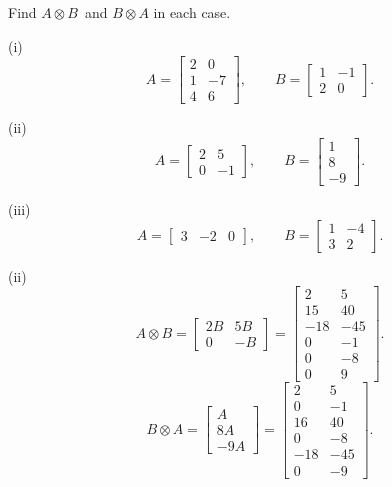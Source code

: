 \begin{Exercises}
\exercise
Find $A\otimes B$~and $B\otimes A$ in each case.
\begin{description}
\item{(i)}
\[
A=\begin{bmatrix}2&0\\ 1&-7\\ 4&6 \end{bmatrix},\qquad
B=\begin{bmatrix}1&-1\\ 2&0 \end{bmatrix}.
\]
\item{(ii)}
\[
A=\begin{bmatrix}2&5\\ 0&-1\end{bmatrix},\qquad
B=\begin{bmatrix}1\\ 8\\ -9 \end{bmatrix}.
\]
\item{(iii)}
\[
A=\begin{bmatrix}3&-2&0 \end{bmatrix},\qquad
B=\begin{bmatrix}1&-4\\ 3&2 \end{bmatrix}.
\]
\end{description}
\begin{ans}
(ii)
\[
A\otimes B=\begin{bmatrix}2B&5B\\0&-B\end{bmatrix}
        =\left[\begin{array}{c|c}
2&5\\ 15&40\\ -18&-45\\ 
\hline
0&-1\\ 0&-8\\ 0&9
\end{array}\right].
\]
\[
B\otimes A=\begin{bmatrix}A\\ 8A\\ -9A \end{bmatrix}
=\left[\begin{array}{cc}
2&5\\ 0&-1\\
\hline
16&40\\ 0&-8\\
\hline
-18&-45\\ 0&-9
\end{array}\right].
\]
\end{ans}


\end{Exercises}
